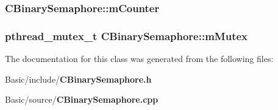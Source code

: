 \subsubsection[{m\-Counter}]{ C\-Binary\-Semaphore\-::m\-Counter\hspace{0.3cm}{\ttfamily [private]}}\label{classCBinarySemaphore_a356dbc03d049fceb01e8370dc9cbfc2e}
\subsubsection[{m\-Mutex}]{\setlength{\rightskip}{0pt plus 5cm}pthread\-\_\-mutex\-\_\-t C\-Binary\-Semaphore\-::m\-Mutex\hspace{0.3cm}{\ttfamily [private]}}\label{classCBinarySemaphore_a7bed0955ec8f413860dd1c8ffa6bdbf4}


The documentation for this class was generated from the following files\-:\begin{DoxyCompactItemize}
\item 
Basic/include/{\bf C\-Binary\-Semaphore.\-h}\item 
Basic/source/{\bf C\-Binary\-Semaphore.\-cpp}\end{DoxyCompactItemize}
